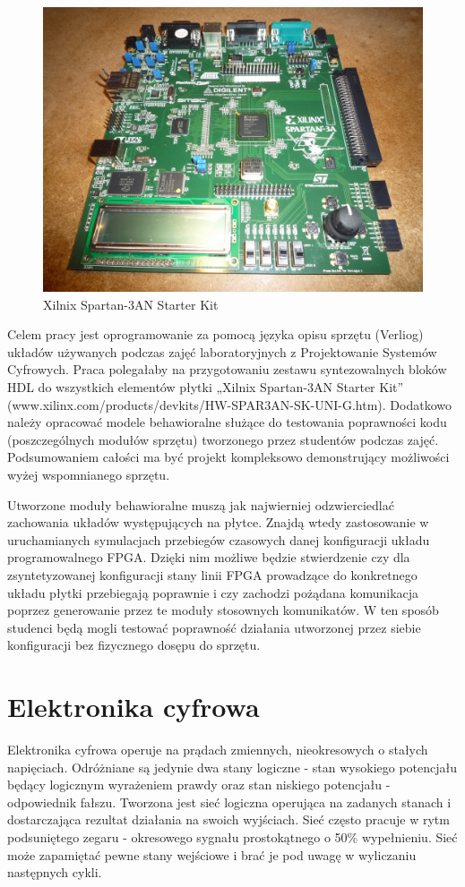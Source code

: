 \documentclass[a4paper,12pt]{article}
\begin{document}
\begin{figure}[htb]
   \centering
   \includegraphics{grafika/spartan3an.jpg}
   \caption{Xilnix Spartan-3AN Starter Kit}
\end{figure}

Celem pracy jest oprogramowanie za pomocą języka opisu sprzętu (Verliog) układów używanych podczas zajęć laboratoryjnych z Projektowanie Systemów Cyfrowych. Praca polegałaby na przygotowaniu zestawu syntezowalnych bloków HDL do wszystkich elementów płytki „Xilnix Spartan-3AN Starter Kit” (www.xilinx.com/products/devkits/HW-SPAR3AN-SK-UNI-G.htm). Dodatkowo należy opracować modele behawioralne służące do testowania poprawności kodu (poszczególnych modułów sprzętu) tworzonego przez studentów podczas zajęć. Podsumowaniem całości ma być projekt kompleksowo demonstrujący możliwości wyżej wspomnianego sprzętu.

Utworzone moduły behawioralne muszą jak najwierniej odzwierciedlać zachowania układów występujących na płytce.
Znajdą wtedy zastosowanie w uruchamianych symulacjach przebiegów czasowych danej konfiguracji układu programowalnego FPGA. Dzięki nim możliwe będzie stwierdzenie czy dla zsyntetyzowanej konfiguracji stany linii FPGA prowadzące do konkretnego układu płytki przebiegają poprawnie i czy zachodzi pożądana komunikacja poprzez generowanie przez te moduły stosownych komunikatów. W ten sposób studenci będą mogli testować poprawność działania utworzonej przez siebie konfiguracji bez fizycznego dosępu do sprzętu.

\section{Elektronika cyfrowa}
Elektronika cyfrowa operuje na prądach zmiennych, nieokresowych o stałych napięciach. Odróżniane są jedynie dwa stany logiczne - stan wysokiego potencjału będący logicznym wyrażeniem prawdy oraz stan niskiego potencjału - odpowiednik fałszu. Tworzona jest sieć logiczna operująca na zadanych stanach i dostarczająca rezultat działania na swoich wyjściach. Sieć często pracuje w rytm podsuniętego zegaru - okresowego sygnału prostokątnego o 50\% wypełnieniu. Sieć może zapamiętać pewne stany wejściowe i brać je pod uwagę w wyliczaniu następnych cykli.
\end{document}
